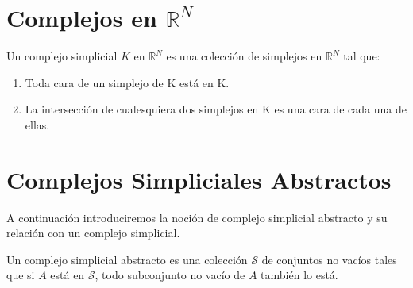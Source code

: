\section{Complejos en $\mathbb{R}^N$}
\begin{Defi}
Un complejo simplicial $K$ en $\mathbb{R}^N$  es una colección de simplejos en $\mathbb{R}^N$ tal que:
\begin{enumerate}
\item Toda cara de un simplejo de K está en K.
\item La intersección de cualesquiera dos simplejos en K es una cara de cada una de ellas.
\end{enumerate}
\end{Defi}
\section{Complejos Simpliciales Abstractos}
A continuación introduciremos la noción de complejo simplicial abstracto y su relación con un complejo simplicial.
\begin{Defi}
Un complejo simplicial abstracto es una colección $\mathcal{S}$ de conjuntos no vacíos tales que si $A$ está en $\mathcal{S}$, todo subconjunto no vacío de $A$ también lo está.   
\end{Defi}
